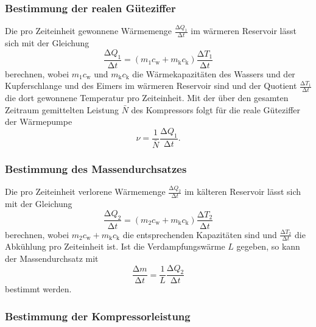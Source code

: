 \subsubsection{Bestimmung der realen Güteziffer}

Die pro Zeiteinheit gewonnene Wärmemenge $\frac{\increment Q_1}{\increment t}$ im
wärmeren Reservoir lässt
sich mit der Gleichung
\begin{equation}
  \frac{\increment Q_1}{\increment t} = (m_1 c_\text{w} + m_\text{k}c_\text{k})
  \frac{\increment T_1}{\increment t}
\end{equation}
berechnen, wobei $m_1 c_\text{w}$ und $m_\text{k}c_\text{k}$ die
Wärmekapazitäten des Wassers und der Kupferschlange und des Eimers im wärmeren
Reservoir sind und der Quotient $\frac{\increment T_1}{\increment t}$ die
dort gewonnene Temperatur pro Zeiteinheit.
Mit der über den gesamten Zeitraum gemittelten Leistung $\bar{N}$ des
Kompressors folgt für die reale Güteziffer der Wärmepumpe
\begin{equation}
  \nu = \frac{1}{\bar{N}}\frac{\increment Q_1}{\increment t}.
\end{equation}

\subsubsection{Bestimmung des Massendurchsatzes}

Die pro Zeiteinheit verlorene Wärmemenge $\frac{\increment Q_2}{\increment t}$ im
kälteren Reservoir lässt sich mit der Gleichung
\begin{equation}
  \frac{\increment Q_2}{\increment t} = (m_2 c_\text{w} + m_\text{k}c_\text{k})
  \frac{\increment T_2}{\increment t}
  \label{eqn:waerme2}
\end{equation}
berechnen, wobei $m_2 c_\text{w} + m_\text{k}c_\text{k}$ die entsprechenden
Kapazitäten sind und $\frac{\increment T_2}{\increment t}$ die Abkühlung pro Zeiteinheit
ist.
Ist die Verdampfungswärme $L$ gegeben, so kann der Massendurchsatz mit
\begin{equation}
  \frac{\increment m}{\increment t} = \frac{1}{L}\frac{\increment Q_2}{\increment t}
  \label{eqn:massendurch}
\end{equation}
bestimmt werden.

\subsubsection{Bestimmung der Kompressorleistung}

